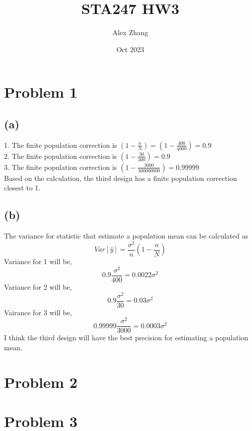\documentclass{article}
\title{STA247 HW3}
\author{Alex Zhang}
\date{Oct 2023}
\begin{document}
\maketitle

\section*{Problem 1}
\subsection*{(a)}
1. The finite population correction is $(1-\frac{n}{N}) = (1-\frac{400}{4000}) = 0.9$\\
2. The finite population correction is $(1-\frac{30}{300}) = 0.9$\\
3. The finite population correction is $(1-\frac{3000}{300000000}) =0.99999 $\\
Based on the calculation, the third design has a finite population correction closest to 1.
\subsection*{(b)}
The variance for statistic that estimate a population mean can be calculated as 
$$Var[\hat{y}] = \frac{\sigma^2}{n}(1-\frac{n}{N})$$
Variance for 1 will be,
$$0.9\frac{\sigma^2}{400} = 0.0022\sigma^2$$
Variance for 2 will be,
$$0.9\frac{\sigma^2}{30} = 0.03\sigma^2$$
Vairance for 3 will be,
$$0.99999\frac{\sigma^2}{3000} = 0.0003\sigma^2$$
I think the third design will have the best precision for estimating a population mean.

\section*{Problem 2}
\section*{Problem 3}
\end{document}
